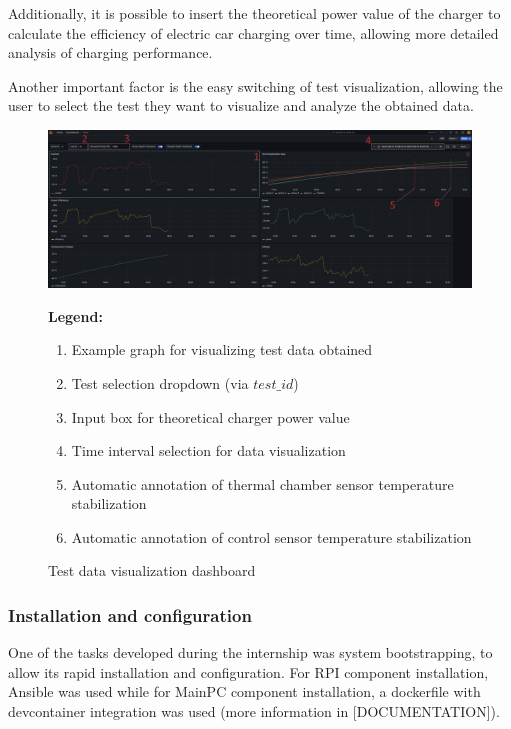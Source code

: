Additionally, it is possible to insert the theoretical power value of the charger to calculate the efficiency of electric car charging over time, allowing more detailed analysis of charging performance.

Another important factor is the easy switching of test visualization, allowing the user to select the test they want to visualize and analyze the obtained data. 

\begin{figure}[H]
    \centering
    \begin{minipage}{0.8\textwidth}
        \includegraphics[width=\linewidth]{figures/dashboard.png}
    \end{minipage}
    \caption{Test data visualization dashboard}
    \label{fig:dashboard}
    
    \vspace{0.5em}
    \begin{minipage}{0.95\textwidth}
        \small
        \textbf{Legend:}
        \begin{enumerate}
            \item Example graph for visualizing test data obtained
            \item Test selection dropdown (via $test\_id$)
            \item Input box for theoretical charger power value
            \item Time interval selection for data visualization
            \item Automatic annotation of thermal chamber sensor temperature stabilization
            \item Automatic annotation of control sensor temperature stabilization
        \end{enumerate}
    \end{minipage}
\end{figure}

\subsubsection{Installation and configuration}
One of the tasks developed during the internship was system bootstrapping, to allow its rapid installation and configuration. For RPI component installation, Ansible was used while for MainPC component installation, a dockerfile with devcontainer integration was used (more information in [DOCUMENTATION]).

